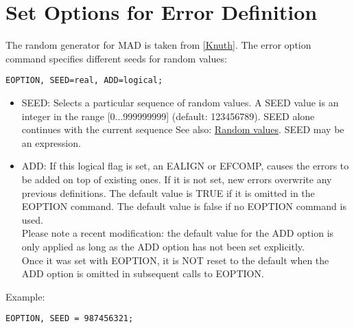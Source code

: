 
\section{Set Options for Error Definition} %
The random generator for MAD is taken from
\href{../Introduction/bibliography.html#knuth}{[Knuth]}. The error
option command specifies different seeds for random values:  

\begin{verbatim}
EOPTION, SEED=real, ADD=logical;
\end{verbatim}

\begin{itemize}
   \item SEED: Selects a particular sequence of random values. A SEED
     value is an integer in the range [0...999999999] (default:
     123456789). SEED alone continues with the current sequence See
     also: \href{../Introduction/expression.html#random}{Random
       values}. SEED may be an expression.  
   \item ADD: If this logical flag is set, an EALIGN or EFCOMP, causes
     the errors to be added on top of existing ones. If it is not set,
     new errors overwrite any previous definitions. The default value is
     TRUE if it is omitted in the EOPTION command. The default value is
     false if no EOPTION command is used.  
\\Please note a recent modification: the default value for the ADD
option is only applied as long as the ADD option has not been set
explicitly. 
\\Once it was set with EOPTION, it is NOT reset to the default when
the ADD option is omitted in subsequent calls to EOPTION.  
\end{itemize} 

Example: 
\begin{verbatim}
EOPTION, SEED = 987456321;
\end{verbatim}

